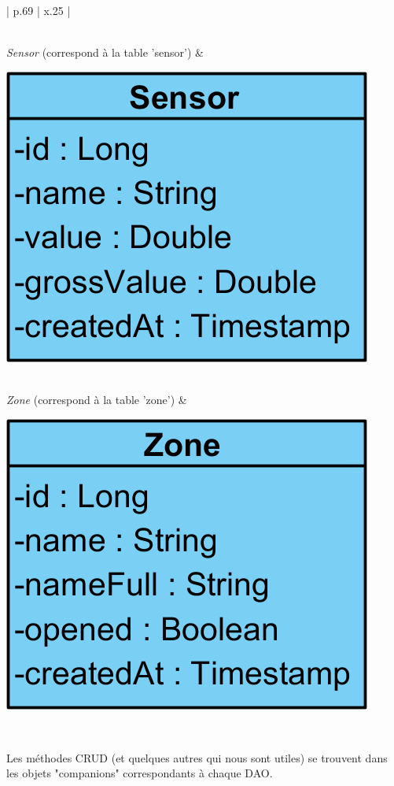 \begin{center}
{\begin{longtable}{| p{.69\textwidth} | x{.25\textwidth} |}
\begin{minipage}{\linewidth}
        \vspace{12pt}
    \end{minipage}\\
    \hline
    \emph{Sensor} (correspond à la table 'sensor') &
    \begin{minipage}{\linewidth}
        \centering
        \vspace{12pt}
        \includegraphics[scale=0.8]{img/sensor}\par
        \vspace{12pt}
    \end{minipage}\\
    \hline
    \emph{Zone} (correspond à la table 'zone') &
    \begin{minipage}{\linewidth}
        \centering
        \vspace{12pt}
        \includegraphics[scale=0.8]{img/zone}\par
        \vspace{12pt}
    \end{minipage}\\
    \hline
    \caption{Entités de la base de données}
\end{longtable}}
\end{center}
\vspace*{-0.7cm}
Les méthodes CRUD (et quelques autres qui nous sont utiles) se trouvent dans les objets "companions" correspondants à chaque DAO.